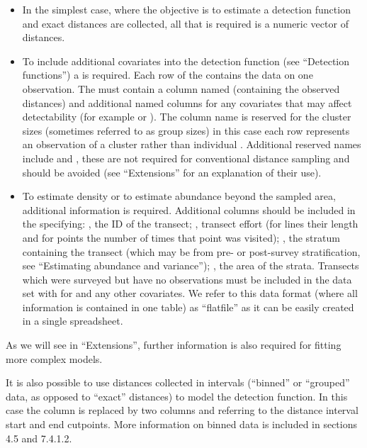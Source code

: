 \documentclass[article]{jss}
\begin{document}
\begin{itemize}
\item In the simplest case, where the objective is to estimate a detection function and exact distances are collected, all that is required is a numeric vector of distances.
\item To include additional covariates into the detection function (see ``Detection functions'') a  is required. Each row of the  contains the data on one observation. The  must contain a column named  (containing the observed distances) and additional named columns for any covariates that may affect detectability (for example  or ). The column name  is reserved for the cluster sizes (sometimes referred to as group sizes) in this case each row represents an observation of a cluster rather than individual \citep[see][Section 1.4.3 for more on defining clusters and ``Extensions'' below for one approach to dealing with uncertain cluster size]{Buckland:2001vm}. Additional reserved names include  and , these are not required for conventional distance sampling and should be avoided (see ``Extensions'' for an explanation of their use).
\item To estimate density or to estimate abundance beyond the sampled area, additional information is required. Additional columns should be included in the  specifying: , the ID of the transect; , transect effort (for lines their length and for points the number of times that point was visited); , the stratum containing the transect (which may be from pre- or post-survey stratification, see ``Estimating abundance and variance''); , the area of the strata. Transects which were surveyed but have no observations must be included in the data set with  for  and any other covariates. We refer to this data format (where all information is contained in one table) as ``flatfile'' as it can be easily created in a single spreadsheet.
\end{itemize}

As we will see in ``Extensions'', further information is also required for fitting more complex models.

It is also possible to use distances collected in intervals (``binned'' or ``grouped'' data, as opposed to ``exact'' distances) to model the detection function. In this case the column  is replaced by two columns  and  referring to the distance interval start and end cutpoints. More information on binned data is included in \cite{Buckland:2001vm} sections 4.5 and 7.4.1.2.
\end{document}
